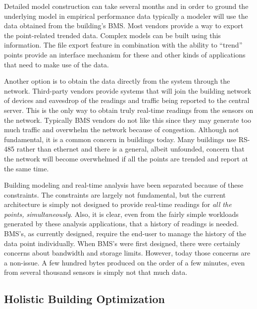 Detailed model construction can take several months and in order to ground the underlying model in empirical performance data
typically a modeler will use the data obtained from the building's BMS.  Most vendors provide a way to export the point-related 
trended data.  Complex models can be built using this information.  The file export feature in combination with the ability to 
``trend'' points provide an interface mechanism for these and other kinds of applications that need to make use of the data.

Another option is to obtain the data directly from the system through the network.  Third-party vendors provide systems that 
will join the building network of devices and eavesdrop of the readings and traffic being reported to the central server.
This is the only way to obtain truly real-time readings from the sensors on the network.
Typically BMS vendors do not like this since they may generate too much traffic and overwhelm the network because of congestion.
Although not fundamental, it is a common concern in buildings today.  Many buildings use RS-485 rather than ethernet and there is
a general, albeit unfounded, concern that the network will become overwhelmed if all the points are trended and report at the same
time.

Building modeling and real-time analysis have been separated because of these constraints.  The constraints are largely not
fundamental, but the current architecture is simply not designed to provide real-time readings for \emph{all the points, simultaneously}.
Also, it is clear, even from the fairly simple workloads generated by these analysis applications, that a history of readings
is needed.  BMS's, as currently designed, require the end-user to manage the history of the data point individually.
When BMS's were first designed, there were certainly concerns about bandwidth and storage limits.  However, today those concerns
are a non-issue.  A few hundred bytes produced on the order of a few minutes, even from several thousand sensors is simply not
that much data.


\subsection{Holistic Building Optimization}

